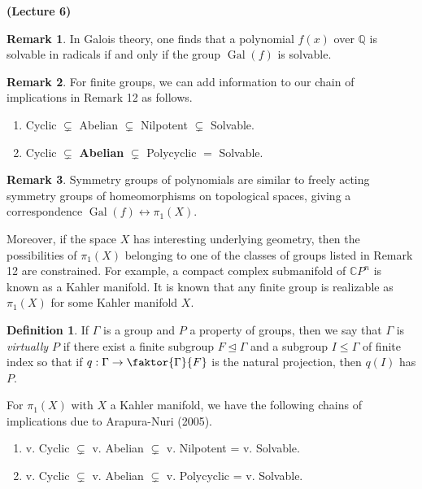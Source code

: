 \documentclass[10pt,letterpaper,cm]{nupset}
\theoremstyle{definition}
\newtheorem*{definition}{Definition}
\newtheorem{remark}{Remark}
\newcommand{\CP}{\mathbb CP}
\newcommand{\Q}{\mathbb Q}
\newcommand{\1}{\mathbf{1}}
\newcommand{\0}{\vec 0}
\DeclareMathOperator{\gal}{Gal}
\begin{document}
\begin{center}
 {\textbf{(Lecture 6)}}
\end{center}

\begin{remark}
In Galois theory, one finds that a polynomial $f(x)$ over $\Q$ is solvable in radicals if and only if the group $\gal(f)$ is solvable. 
\end{remark}

\begin{remark}
For finite groups, we can add information to our chain of implications in Remark 12 as follows.
\begin{enumerate}
\item Cyclic $\subsetneq$ Abelian $\subsetneq$ Nilpotent $\subsetneq$ Solvable.
\item Cyclic $\subsetneq$ \textbf{Abelian} $\subsetneq$ Polycyclic $\bm =$  Solvable.
\end{enumerate}
\end{remark}

\begin{remark}
Symmetry groups of polynomials are similar to freely acting symmetry groups of homeomorphisms on topological spaces, giving a correspondence $\gal(f) \leftrightarrow \pi_1(X)$. 

Moreover, if the space $X$ has interesting underlying geometry, then the possibilities of $\pi_1(X)$ belonging to one of the classes of groups listed in Remark 12 are constrained. For example,
a compact complex submanifold of $\CP^n$ is known as a Kahler manifold. It is known that any finite group is realizable as $\pi_1(X)$ for some Kahler manifold $X$.
\begin{definition}
If $\Gamma$ is a group and $P$ a property of groups, then we say that $\Gamma$ is \textit{virtually $P$} if there exist a finite subgroup $F \unlhd \Gamma$ and a subgroup $I \leq \Gamma$ of finite index so that if $q: \Gamma \to \faktor{\Gamma}{F}$ is the natural projection, then $q(I)$ has $P$. 
\end{definition}
For $\pi_1(X)$ with $X$ a Kahler manifold, we have the following chains of implications due to Arapura-Nuri (2005).
\begin{enumerate}
\item v. Cyclic $\subsetneq$ v. Abelian $\subsetneq$ v. Nilpotent = v. Solvable.
\item v. Cyclic $\subsetneq$ v. Abelian $\subsetneq$ v. Polycyclic = v. Solvable.
\end{enumerate}
\end{remark}
\end{document}
